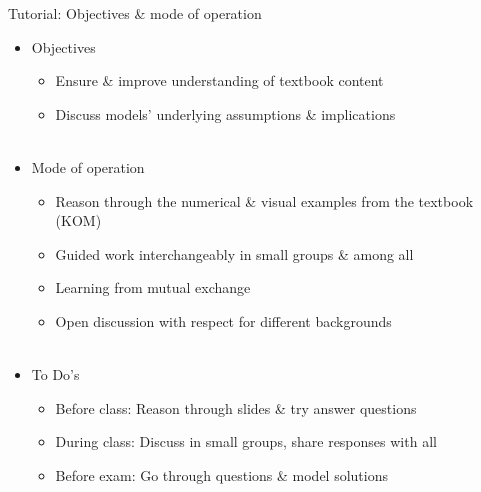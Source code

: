 \documentclass{beamer}
\begin{document}
\begin{frame}{Tutorial: Objectives \& mode of operation}

\begin{itemize}
    \item Objectives
        \begin{itemize}
            \item Ensure \& improve understanding of textbook content
            \item Discuss models' underlying assumptions \& implications \\~\\
        \end{itemize}
    
    \item Mode of operation
        \begin{itemize}
            \item Reason through the numerical \& visual examples from the textbook (KOM)
            \item Guided work interchangeably in small groups \& among all
            \item Learning from mutual exchange
            \item Open discussion with respect for different backgrounds \\~\\
        \end{itemize}

    \item To Do's
    \begin{itemize}
        \item Before class: Reason through slides \& try answer questions
        \item During class: Discuss in small groups, share responses with all
        \item Before exam: Go through questions \& model solutions
    \end{itemize}
    
        
\end{itemize}    
\end{frame}

\end{document}
